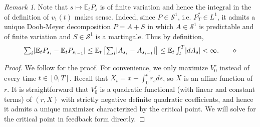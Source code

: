 \documentclass[openany,oneside]{article}
\theoremstyle{definition}
\theoremstyle{remark}
\newtheorem{rem}[thm]{Remark}
\newcommand{\E}{\mathbb{E}} %
\DeclarePairedDelimiter{\abs}{\lvert}{\rvert} %
\newcommand{\ts}{\textstyle}
\newcommand{\closeEqn}{\tag*{$\diamond$}}
\begin{document}
\begin{rem}
Note that $s\mapsto \E_t P_s$ is of finite variation and hence the integral in the of definition of $v_1(t)$ makes sense. Indeed, since $P\in \mathcal{S}^1$, i.e. $P^\ast_T \in L^1$, it admits a unique Doob-Meyer decomposition $P=A+S$ in which $A\in\mathcal{S}^1$ is predictable and of finite variation and $S\in\mathcal{S}^1$ is a martingale. Thus by definition,
\[
 \ts \sum_i \abs{\E_t P_{s_i} - \E_t P_{s_{i-1}}} \le \E_t\left[\sum_i \abs{A_{s_i} - A_{s_{i-1}}}\right] \le \E_t \int_t^T \abs{d A_s} < \infty.\closeEqn
\]
\end{rem}

\begin{proof}
We follow \cite{bouchard2017equilibrium} for the proof. For convenience, we only maximize $V^r_0$ instead of every time $t\in[0,T]$. Recall that $X_t = x-\int_0^t r_s ds$, so $X$ is an affine function of $r$. It is straightforward that $V^r_0$ is a quadratic functional (with linear and constant terms) of $(r,X)$ with strictly negative definite quadratic coefficients, and hence it admits a unique maximizer characterized by the critical point. We will solve for the critical point in feedback form directly.


\end{proof}
\end{document}
